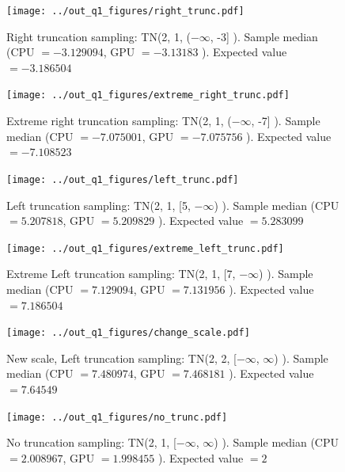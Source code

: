 \documentclass[9pt]{amsart}
\begin{document}
\begin{figure}[htbp] %
   \centering
   \texttt{[image: ../out\_q1\_figures/right\_trunc.pdf]} 
   \caption{Right truncation sampling:  TN\Big (2, 1, ($-\infty$, -3] \Big ). Sample median (CPU $= -3.129094$, GPU $= -3.13183  $ ). Expected value $= -3.186504$ } 
   \label{fig:right}
\end{figure}


\begin{figure}[htbp] %
   \centering
   \texttt{[image: ../out\_q1\_figures/extreme\_right\_trunc.pdf]} 
   \caption{Extreme right truncation sampling:  TN\Big (2, 1, ($-\infty$, -7] \Big ). Sample median (CPU $= -7.075001$, GPU $= -7.075756 $ ). Expected value $=  -7.108523$ } 
   \label{fig:extright}
\end{figure}

\begin{figure}[htbp] %
   \centering
   \texttt{[image: ../out\_q1\_figures/left\_trunc.pdf]} 
   \caption{Left  truncation sampling:  TN\Big (2, 1, [5, $-\infty$) \Big ). Sample median (CPU $= 5.207818$, GPU $=5.209829 $ ). Expected value $= 5.283099$ } 
   \label{fig:ltrunc}
\end{figure}

\begin{figure}[htbp] %
   \centering
   \texttt{[image: ../out\_q1\_figures/extreme\_left\_trunc.pdf]} 
   \caption{Extreme Left  truncation sampling:  TN\Big (2, 1, [7, $-\infty$) \Big ). Sample median (CPU $= 7.129094$, GPU $=  7.131956$ ). Expected value $=  7.186504$ } 
   \label{fig:eltrunc}
\end{figure}


\begin{figure}[htbp] %
   \centering
   \texttt{[image: ../out\_q1\_figures/change\_scale.pdf]} 
   \caption{New scale, Left truncation sampling:  TN\Big (2, 2, [$-\infty$, $\infty$) \Big ). Sample median (CPU $= 7.480974 $, GPU $=7.468181  $ ). Expected value $= 7.64549$ } 
   \label{fig:newscaletrunc}
\end{figure}


\begin{figure}[htbp] %
   \centering
   \texttt{[image: ../out\_q1\_figures/no\_trunc.pdf]} 
   \caption{No truncation sampling:  TN\Big (2, 1, [$-\infty$, $\infty$) \Big ). Sample median (CPU $= 2.008967$, GPU $=1.998455 $ ). Expected value $= 2$ } 
   \label{fig:notrunc}
\end{figure}
\end{document}
